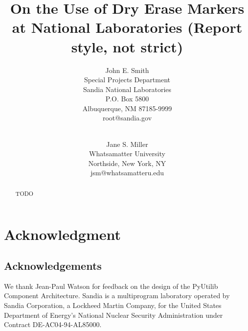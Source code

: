 \documentclass[pdf,ps2pdf,12pt,report,OUO]{SANDreport}
\title{On the Use of Dry Erase Markers at National Laboratories (Report style, not strict)}
\author{John E. Smith \\
	  Special Projects Department \\
	  Sandia National Laboratories\\
	  P.O. Box 5800\\
	  Albuquerque, NM 87185-9999 \\
	  root@sandia.gov \\
	  \\
	  \and
	  Jane S. Miller \\
	  Whatsamatter University \\
	  Northside, New York, NY\\
	  jsm@whatsamatteru.edu
	 }
\date{}
\begin{document}
    \maketitle

    \begin{abstract}
	TODO %
    \end{abstract}


    \clearpage
    \chapter*{Acknowledgment}
    \section*{Acknowledgements}

We thank Jean-Paul Watson for feedback on the design of the PyUtilib Component Architecture.
Sandia is a multiprogram laboratory operated by Sandia Corporation,
a Lockheed Martin Company, for the United States Department of
Energy's National Nuclear Security Administration under Contract
DE-AC04-94-AL85000.


    \cleardoublepage		%
    \tableofcontents
    \listoffigures
    \listoftables


\end{document}

